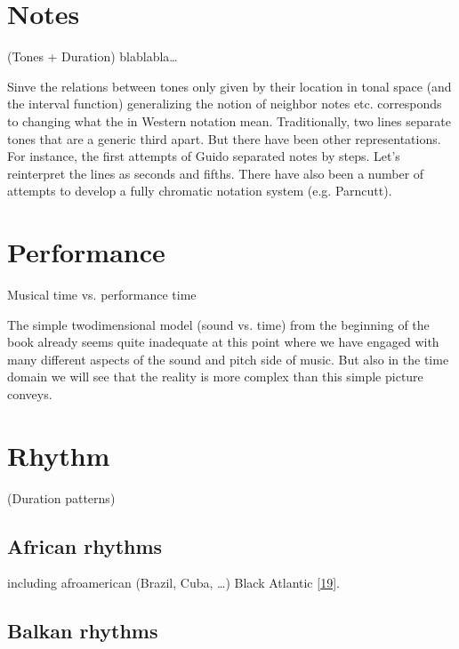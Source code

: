 \documentclass[letterpaper,10pt,english]{sphinxmanual}
\begin{document}
\section{Notes}
\label{\detokenize{4_time:notes}}
\sphinxAtStartPar
(Tones + Duration)
blablabla…

\sphinxAtStartPar
Sinve the relations between tones only given by
their location in tonal space (and the interval function)
generalizing the notion of neighbor notes etc. corresponds
to changing what the  in Western notation mean.
Traditionally, two lines separate tones that are a generic third apart.
But there have been other representations.
For instance, the first attempts of Guido separated notes by steps.
Let’s reinterpret the lines as seconds and fifths.
There have also been a number of attempts to develop a fully chromatic
notation system (e.g. Parncutt).


\section{Performance}
\label{\detokenize{4_time:performance}}
\sphinxAtStartPar
Musical time vs. performance time

\sphinxAtStartPar
The simple two\sphinxhyphen{}dimensional model (sound vs. time) from the beginning of the book already
seems quite inadequate at this point where we have engaged with many different aspects of the
sound and pitch side of music. But also in the time domain we will see that the reality is more
complex than this simple picture conveys.


\section{Rhythm}
\label{\detokenize{4_time:rhythm}}
\sphinxAtStartPar
(Duration patterns)


\subsection{African rhythms}
\label{\detokenize{4_time:african-rhythms}}
\sphinxAtStartPar
including afro\sphinxhyphen{}american (Brazil, Cuba, …) Black Atlantic {[}\hyperlink{cite.8_bibliography:id6}{19}{]}.


\subsection{Balkan rhythms}
\label{\detokenize{4_time:balkan-rhythms}}
\end{document}
